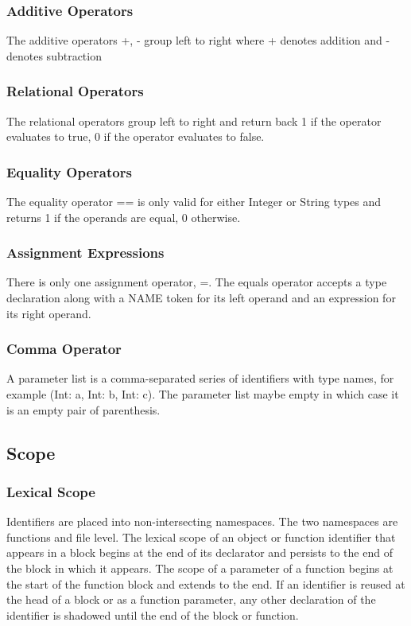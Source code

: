 \documentclass[12pt]{article}
\begin{document}
\subsubsection{Additive Operators}
The additive operators +, - group left to right where + denotes addition and - denotes subtraction

\subsubsection{Relational Operators}
The relational operators group left to right and return back 1 if the operator evaluates to true, 0 if the operator evaluates to false. 
 
\subsubsection{Equality Operators}
The equality operator == is only valid for either Integer or String types and returns 1 if the operands are equal, 0 otherwise. 

\subsubsection{Assignment Expressions}
There is only one assignment operator, =.  The equals operator accepts a type declaration along with a NAME token for its left operand and an expression for its right operand. 
 
\subsubsection{Comma Operator}
A parameter list is a comma-separated series of identifiers with type names, for example (Int: a, Int: b, Int: c). The parameter list maybe empty in which case it is an empty pair of parenthesis. 

\subsection{Scope}

\subsubsection{Lexical Scope}
Identifiers are placed into non-intersecting namespaces.  The two namespaces are functions and file level.  The lexical scope of an object or function identifier that appears in a block begins at the end of its declarator and persists to the end of the block in which it appears.  The scope of a parameter of a function begins at the start of the function block and extends to the end.  If an identifier is reused at the head of a block or as a function parameter, any other declaration of the identifier is shadowed until the end of the block or function. 
\end{document}
